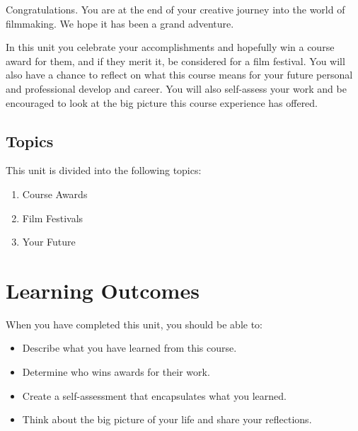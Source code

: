 \documentclass[
]{book}
\providecommand{\tightlist}{%
  \setlength{\itemsep}{0pt}\setlength{\parskip}{0pt}}
\begin{document}
Congratulations. You are at the end of your creative journey into the world of filmmaking. We hope it has been a grand adventure.

In this unit you celebrate your accomplishments and hopefully win a course award for them, and if they merit it, be considered for a film festival. You will also have a chance to reflect on what this course means for your future personal and professional develop and career. You will also self-assess your work and be encouraged to look at the big picture this course experience has offered.

\hypertarget{topics-9}{%
\subsection*{Topics}\label{topics-9}}

This unit is divided into the following topics:

\begin{enumerate}
\def\labelenumi{\arabic{enumi}.}
\tightlist
\item
  Course Awards\\
\item
  Film Festivals\\
\item
  Your Future
\end{enumerate}

\hypertarget{learning-outcomes-9}{%
\section*{Learning Outcomes}\label{learning-outcomes-9}}

When you have completed this unit, you should be able to:

\begin{itemize}
\tightlist
\item
  Describe what you have learned from this course.\\
\item
  Determine who wins awards for their work.\\
\item
  Create a self-assessment that encapsulates what you learned.\\
\item
  Think about the big picture of your life and share your reflections.
\end{itemize}
\end{document}
